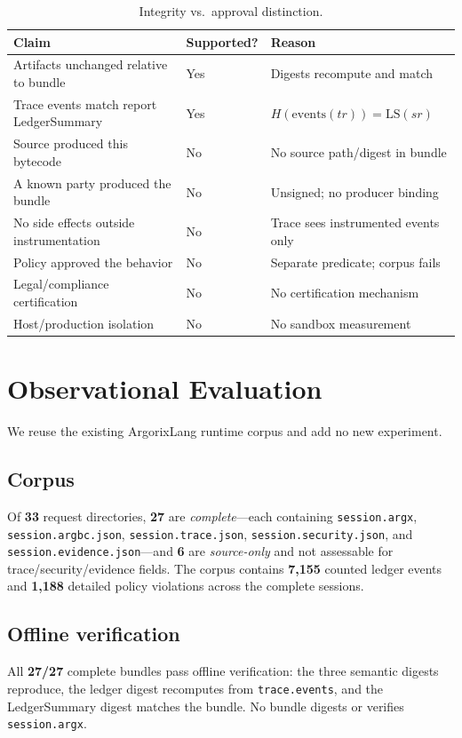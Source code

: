\documentclass[conference]{IEEEtran}
\newcommand{\code}[1]{\texttt{\small #1}}
\newcommand{\Argorix}{%
\textcolor{argViolet}{A}\textcolor{argViolet}{r}\textcolor{argIndigo}{g}\textcolor{argIndigo}{o}\textcolor{argElectric}{r}\textcolor{argElectric}{i}\textcolor{argElectric}{x}\textcolor{argCyan}{L}\textcolor{argCyan}{a}\textcolor{argCyanBright}{n}\textcolor{argCyanBright}{g}\xspace}
\begin{document}
\begin{table}[t]
\centering
\caption{Integrity vs.\ approval distinction.}
\label{tab:vsapproval}
\renewcommand{\arraystretch}{1.25}
\scriptsize
\setlength{\tabcolsep}{3pt}
\begin{tabular}{@{}L{0.46\columnwidth}L{0.14\columnwidth}L{0.28\columnwidth}@{}}
\toprule
\textbf{Claim} & \textbf{Supported?} & \textbf{Reason} \\
\midrule
Artifacts unchanged relative to bundle & Yes & Digests recompute and match \\
Trace events match report LedgerSummary & Yes & $H(\mathrm{events}(tr))=\mathrm{LS}(sr)$ \\
Source produced this bytecode & No & No source path/digest in bundle \\
A known party produced the bundle & No & Unsigned; no producer binding \\
No side effects outside instrumentation & No & Trace sees instrumented events only \\
Policy approved the behavior & No & Separate predicate; corpus fails \\
Legal/compliance certification & No & No certification mechanism \\
Host/production isolation & No & No sandbox measurement \\
\bottomrule
\end{tabular}
\end{table}

\section{Observational Evaluation}\label{sec:eval}
We reuse the existing \Argorix runtime corpus \cite{venegas2026argorixlang} and add no
new experiment.

\subsection{Corpus}
Of \textbf{33} request directories, \textbf{27} are \emph{complete}---each containing
\code{session.argx}, \code{session.argbc.json}, \code{session.trace.json},
\code{session.security.json}, and \code{session.evidence.json}---and \textbf{6} are
\emph{source-only} and not assessable for trace/security/evidence fields. The corpus
contains \textbf{7{,}155} counted ledger events and \textbf{1{,}188} detailed policy
violations across the complete sessions.

\subsection{Offline verification}
All \textbf{27/27} complete bundles pass offline verification: the three semantic digests
reproduce, the ledger digest recomputes from \code{trace.events}, and the LedgerSummary
digest matches the bundle. No bundle digests or verifies \code{session.argx}.
\end{document}
